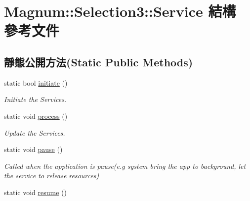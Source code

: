 \hypertarget{struct_magnum_1_1_selection3_1_1_service}{}\section{Magnum\+:\+:Selection3\+:\+:Service 結構 參考文件}
\label{struct_magnum_1_1_selection3_1_1_service}
\subsection*{靜態公開方法(Static Public Methods)}
\begin{DoxyCompactItemize}
\item 
static bool \hyperlink{struct_magnum_1_1_selection3_1_1_service_af97577d357a0dd71955f6e716b5b20a8}{initiate} ()
\begin{DoxyCompactList}\small\item\em Initiate the Services. \end{DoxyCompactList}\item 
static void \hyperlink{struct_magnum_1_1_selection3_1_1_service_a7f103ac6e4b241a1322a9ab90fe5c332}{process} ()\hypertarget{struct_magnum_1_1_selection3_1_1_service_a7f103ac6e4b241a1322a9ab90fe5c332}{}\label{struct_magnum_1_1_selection3_1_1_service_a7f103ac6e4b241a1322a9ab90fe5c332}

\begin{DoxyCompactList}\small\item\em Update the Services. \end{DoxyCompactList}\item 
static void \hyperlink{struct_magnum_1_1_selection3_1_1_service_abf6385a929f1e0a4906e3500fa0f2880}{pause} ()\hypertarget{struct_magnum_1_1_selection3_1_1_service_abf6385a929f1e0a4906e3500fa0f2880}{}\label{struct_magnum_1_1_selection3_1_1_service_abf6385a929f1e0a4906e3500fa0f2880}

\begin{DoxyCompactList}\small\item\em Called when the application is pause(e.\+g system bring the app to background, let the service to release resources) \end{DoxyCompactList}\item 
static void \hyperlink{struct_magnum_1_1_selection3_1_1_service_a7fb1c906d4f97ac9b7ae35ca7856b601}{resume} ()\hypertarget{struct_magnum_1_1_selection3_1_1_service_a7fb1c906d4f97ac9b7ae35ca7856b601}{}\label{struct_magnum_1_1_selection3_1_1_service_a7fb1c906d4f97ac9b7ae35ca7856b601}


\end{DoxyCompactItemize}
